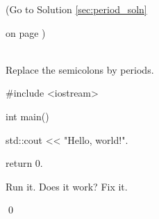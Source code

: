 \label{sec:period}

(Go to Solution \ref{sec:period_soln} 

on page \pageref{sec:period_soln}) 

\\

Replace the semicolons by periods.

\begin{console}

#include <iostream>



int main()

{

    std::cout << "Hello, world!\n".



    return 0.

}

\end{console}

Run it. Does it work? Fix it.

\qed

